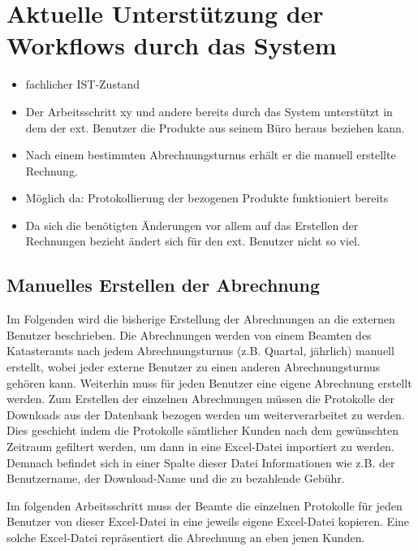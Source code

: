 \section{Aktuelle Unterstützung der Workflows durch das System}
\begin{itemize}
	\item fachlicher IST-Zustand
	\item Der Arbeitsschritt xy und andere bereits durch das System unterstützt in dem der ext. Benutzer die Produkte aus seinem Büro heraus beziehen kann.
	\item Nach einem bestimmten Abrechnungsturnus erhält er die manuell erstellte Rechnung.
	\item Möglich da: Protokollierung der bezogenen Produkte funktioniert bereits
	\item Da sich die benötigten Änderungen vor allem auf das Erstellen der Rechnungen bezieht ändert sich für den ext. Benutzer nicht so viel.
\end{itemize}

\subsection{Manuelles Erstellen der Abrechnung}
Im Folgenden wird die bisherige Erstellung der Abrechnungen an die externen Benutzer beschrieben. Die Abrechnungen werden von einem Beamten des Katasteramts nach jedem Abrechnungsturnus (z.B. Quartal, jährlich) manuell erstellt, wobei jeder externe Benutzer zu einen anderen Abrechnungsturnus gehören kann.
Weiterhin muss für jeden Benutzer eine eigene Abrechnung erstellt werden.
Zum Erstellen der einzelnen Abrechnungen müssen die Protokolle der Downloads aus der Datenbank bezogen werden um weiterverarbeitet zu werden. Dies geschieht indem die Protokolle sämtlicher Kunden nach dem gewünschten Zeitraum gefiltert werden, um dann in eine Excel-Datei importiert zu werden.
Demnach befindet sich in einer Spalte dieser Datei Informationen wie z.B. der Benutzername, der Download-Name und die zu bezahlende Gebühr.

Im folgenden Arbeitsschritt muss der Beamte die einzelnen Protokolle für jeden Benutzer von dieser Excel-Datei in eine jeweils eigene Excel-Datei kopieren. Eine solche Excel-Datei repräsentiert die Abrechnung an eben jenen Kunden.

